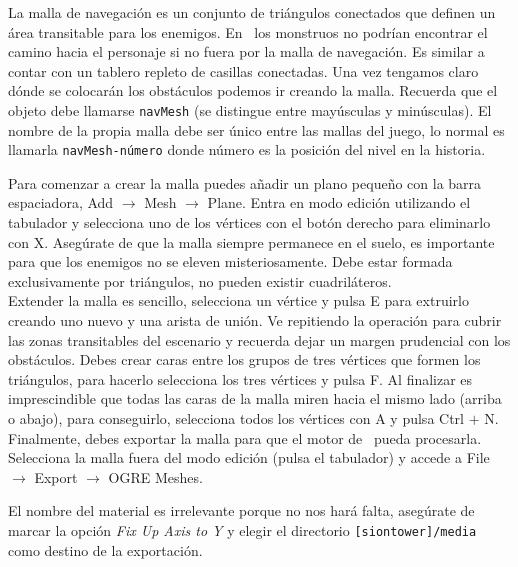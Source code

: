 La malla de navegación es un conjunto de triángulos conectados que definen
un área transitable para los enemigos. En \juego\ los monstruos no podrían
encontrar el camino hacia el personaje si no fuera por la malla de navegación.
Es similar a contar con un tablero repleto de casillas conectadas. Una vez
tengamos claro dónde se colocarán los obstáculos podemos ir creando la malla.
Recuerda que el objeto debe llamarse \texttt{navMesh} (se distingue entre
mayúsculas y minúsculas). El nombre de la propia malla debe ser único
entre las mallas del juego, lo normal es llamarla \texttt{navMesh-número}
donde número es la posición del nivel en la historia.


Para comenzar a crear la malla puedes añadir un plano pequeño con la barra
espaciadora, Add $\rightarrow$ Mesh $\rightarrow$ Plane. Entra en modo edición
utilizando el tabulador y selecciona uno de los vértices con el botón derecho
para eliminarlo con X. Asegúrate de que la malla siempre permanece en el suelo,
es importante para que los enemigos no se eleven misteriosamente. Debe estar
formada exclusivamente por triángulos, no pueden existir cuadriláteros.\\

Extender la malla es sencillo, selecciona un vértice y pulsa E para extruirlo
creando uno nuevo y una arista de unión. Ve repitiendo la operación para
cubrir las zonas transitables del escenario y recuerda dejar un margen
prudencial con los obstáculos. Debes crear caras entre los grupos de tres
vértices que formen los triángulos, para hacerlo selecciona los tres vértices
y pulsa F. Al finalizar es imprescindible que todas las caras de la malla
miren hacia el mismo lado (arriba o abajo), para conseguirlo, selecciona
todos los vértices con A y pulsa Ctrl $+$ N.\\

Finalmente, debes exportar la malla para que el motor de \juego\ pueda
procesarla. Selecciona la malla fuera del modo edición (pulsa el tabulador)
y accede a File $\rightarrow$ Export $\rightarrow$ OGRE Meshes.


El nombre del material es irrelevante porque no nos hará falta, asegúrate
de marcar la opción \textit{Fix Up Axis to Y} y elegir el directorio
\texttt{[siontower]/media} como destino de la exportación.

